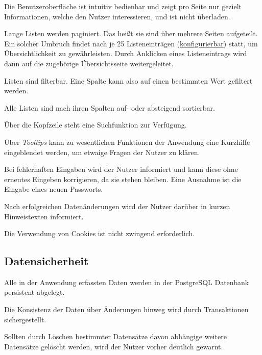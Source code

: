 \begin{description}
	 Die Benutzeroberfläche ist intuitiv bedienbar und zeigt pro Seite nur gezielt Informationen, welche den Nutzer interessieren, und ist nicht überladen.

	 \label{leist:40} Lange Listen werden paginiert. Das heißt sie sind über mehrere Seiten aufgeteilt. Ein solcher Umbruch findet nach je 25 Listeneinträgen (\hyperref[d055]{konfigurierbar}) statt, um Übersichtlichkeit zu gewährleisten. Durch Anklicken eines Listeneintrags wird dann auf die zugehörige Übersichtsseite weitergeleitet.

	 Listen sind filterbar. Eine Spalte kann also auf einen bestimmten Wert gefiltert werden.

	 Alle Listen sind nach ihren Spalten auf- oder absteigend sortierbar.

	 Über die Kopfzeile steht eine Suchfunktion zur Verfügung.

	 Über \emph{Tooltips} kann zu wesentlichen Funktionen der Anwendung eine Kurzhilfe eingeblendet werden, um etwaige Fragen der Nutzer zu klären.

	 Bei fehlerhaften Eingaben wird der Nutzer informiert und kann diese ohne erneutes Eingeben korrigieren, da sie stehen bleiben. Eine Ausnahme ist die Eingabe eines neuen Passworts.

	 Nach erfolgreichen Datenänderungen wird der Nutzer darüber in kurzen Hinweistexten informiert.

	 Die Verwendung von Cookies ist nicht zwingend erforderlich.
\end{description}

\subsection{Datensicherheit}

\begin{description}
	 Alle in der Anwendung erfassten Daten werden in der PostgreSQL Datenbank persistent abgelegt.

	 Die Konsistenz der Daten über Änderungen hinweg wird durch Transaktionen sichergestellt.

	 Sollten durch Löschen bestimmter Datensätze davon abhängige weitere Datensätze gelöscht werden, wird der Nutzer vorher deutlich gewarnt.
\end{description}

